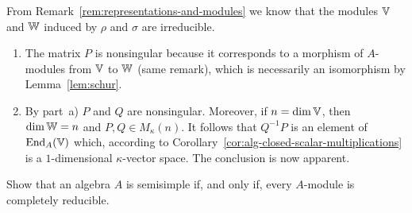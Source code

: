 \begin{solution}
    From Remark~\ref{rem:representations-and-modules} we know that the modules $\mathbb V$ and $\mathbb W$ induced by $\rho$ and $\sigma$ are irreducible.
    \begin{enumerate}[\rm a)]
        \item The matrix $P$ is nonsingular because it corresponds to a morphism of $A$-modules from $\mathbb V$ to $\mathbb W$ (same remark), which is necessarily an isomorphism by Lemma~\ref{lem:schur}.

        \item By part~a) $P$ and $Q$ are nonsingular. Moreover, if $n=\dim\mathbb V$, then $\dim\mathbb W=n$ and $P,Q\in M_\kappa(n)$. It follows that $Q^{-1}P$ is an element of ${\operatorname{End}}_A(\mathbb V)$ which, according to Corollary~\ref{cor:alg-closed-scalar-multiplications} is a $1$-dimensional $\kappa$-vector space. The conclusion is now apparent.
    \end{enumerate}
\end{solution}


\begin{probl}\label{probl:A-semisimple-iff-V-completely-reducible}
    Show that an algebra\/ $A$ is semisimple if, and only if, every\/ $A$-module is completely reducible. 
\end{probl}

